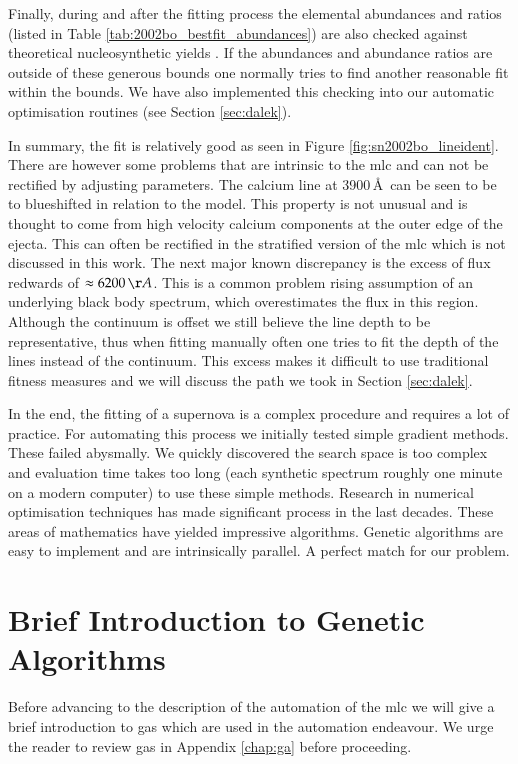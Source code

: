 Finally, during and after the fitting process the elemental abundances and ratios (listed in Table \ref{tab:2002bo_bestfit_abundances}) are also checked against theoretical nucleosynthetic yields \citep[e.g.][]{1999ApJS..125..439I}. If the abundances and abundance ratios are outside of these generous bounds one normally tries to find another reasonable fit within the bounds. We have also implemented this checking into our automatic optimisation routines (see Section \ref{sec:dalek}).

In summary, the fit is relatively good as seen in Figure \ref{fig:sn2002bo_lineident}. There are however some problems that are intrinsic to the \gls{mlc} and can not be rectified by adjusting parameters. The calcium line at 3900\,\AA\ can be seen to be to blueshifted in relation to the model. This property is not unusual and is thought to come from high velocity calcium components at the outer edge of the ejecta. This can often be rectified in the stratified version of the \gls{mlc} which is not discussed in this work. The next major known discrepancy is the excess of flux redwards of  $\approx 6200\,\AA$.  This is a common problem rising assumption of an underlying black body spectrum, which overestimates the flux in this region. Although the continuum is offset we still believe the line depth to be representative, thus when fitting manually often one tries to fit the depth of the lines instead of the continuum. This excess makes it difficult to use traditional fitness measures and we will discuss the path we took in Section \ref{sec:dalek}.

In the end, the fitting of a supernova is a complex procedure and requires a lot of practice. For automating this process we initially tested simple gradient methods. These failed abysmally. We quickly discovered the search space is too complex and evaluation time takes too long (each synthetic spectrum roughly one minute on a modern computer) to use these simple methods. Research in numerical optimisation techniques has made significant process in the last decades. These areas of mathematics have yielded impressive algorithms. Genetic algorithms are easy to implement and are intrinsically parallel. A perfect match for our problem.

\section{Brief Introduction to Genetic Algorithms}
\label{sec:ga_brief_intro}
Before advancing to the description of the automation of the \gls{mlc} we will give a brief introduction to \glspl{ga} which are used in the automation endeavour.   We urge the reader to review \glspl{ga} in Appendix \ref{chap:ga} before proceeding. 

